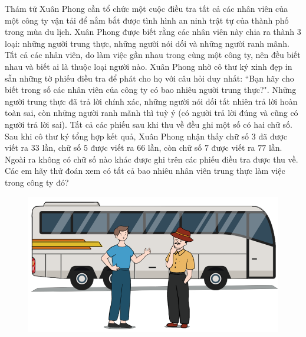 \begin{multicols}{2}
	Thám tử Xuân Phong cần tổ chức một cuộc điều tra tất cả các nhân viên của một công ty vận tải để nắm bắt được tình hình an ninh trật tự của thành phố trong mùa du lịch. Xuân Phong được biết rằng các nhân viên này chia ra thành $3$ loại: những người trung thực, những người nói dối và những người ranh mãnh. Tất cả các nhân viên, do làm việc gần nhau trong cùng một công ty, nên đều biết nhau và biết ai là thuộc loại người nào. Xuân Phong nhờ cô thư ký xinh đẹp in sẵn những tờ phiếu điều tra để phát cho họ với câu hỏi duy nhất: ``Bạn hãy cho biết trong số các nhân viên của công ty có bao nhiêu người trung thực?". Những người trung thực đã trả lời chính xác, những người nói dối tất nhiên trả lời hoàn toàn sai, còn những người ranh mãnh thì tuỳ ý (có người trả lời đúng và cũng có người trả lời sai). Tất cả các phiếu sau khi thu về đều ghi một số có hai chữ số. Sau khi cô thư ký tổng hợp kết quả, Xuân Phong nhận thấy chữ số $3$ đã được viết ra $33$ lần, chữ số $5$ được viết ra $66$ lần, còn chữ số $7$ được viết ra $77$ lần. Ngoài ra không có chữ số nào khác được ghi trên các phiếu điều tra được thu về. Các em hãy thử đoán xem có tất cả bao nhiêu nhân viên trung thực làm việc trong công ty đó?
	\begin{figure}[H]
		\centering
		\vspace*{-5pt}
		\captionsetup{labelformat= empty, justification=centering}
		\includegraphics[width=1\linewidth]{xp}
	\end{figure}
\end{multicols}
\newpage
\begingroup
